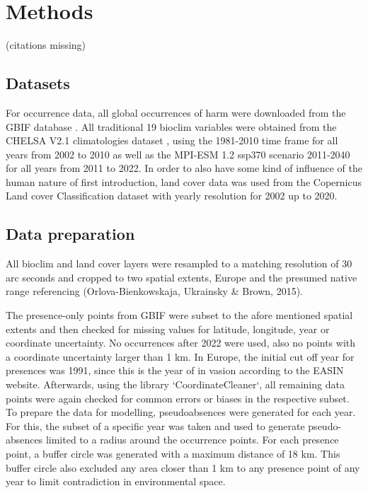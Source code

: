 \documentclass[12pt,a4paper]{article}
\begin{document}
\newpage
\section{Methods}
(citations missing)
\subsection{Datasets}
For occurrence data, all global occurrences of \gls{harm} were downloaded from the GBIF database \autocite{GBIFaxyridisdataset}.
All traditional 19 bioclim variables were obtained from the CHELSA V2.1 climatologies dataset \autocite{karger2017CHELSApaper, CHELSAbioclimdataset}, using the 1981-2010 time frame for all years from 2002 to 2010 as well as the MPI-ESM 1.2 ssp370 scenario 2011-2040 for all years from 2011 to 2022. 
In order to also have some kind of influence of the human nature of first introduction, land cover data was used from the Copernicus Land cover Classification dataset \autocite{COPlandcoverdataset}  with yearly resolution for 2002 up to 2020.

\subsection{Data preparation}
All bioclim and land cover layers were resampled to a matching resolution of 30 arc seconds and cropped to two spatial extents, Europe and the presumed native range referencing (Orlova-Bienkowskaja, Ukrainsky \& Brown, 2015).

The presence-only points from GBIF were subset to the afore mentioned spatial extents and then checked for missing values for latitude, longitude, year or coordinate uncertainty. 
No occurrences after 2022 were used, also no points with a coordinate uncertainty larger than 1 km. 
In Europe, the initial cut off year for presences was 1991, since this is the year of in vasion according to the EASIN website.
Afterwards, using the library `CoordinateCleaner`, all remaining data points were again checked for common errors or biases in the respective subset.
To prepare the data for modelling, pseudoabsences were generated for each year. 
For this, the subset of a specific year was taken and used to generate pseudo-absences limited to a radius around the occurrence points.
For each presence point, a buffer circle was generated with a maximum distance of 18 km. This buffer circle also excluded any area closer than 1 km to any presence point of any year to limit contradiction in environmental space.
\end{document}
